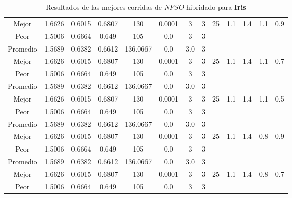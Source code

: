 \begin{table}[h!]
\begin{center}
\begin{tabular}{|c|c|c|c|c|c|c|c|c|c|c|c|c|}
            \cline{1-8}
            Mejor & 1.6626 & 0.6015  & 0.6807 & 130 & 0.0001 & 3 & 3 & 25 & 1.1 & 1.4 & 1.1 & 0.9\\
            \cline{1-8}
            Peor & 1.5006 & 0.6664  & 0.649 & 105 & 0.0 & 3 & 3 &  &  &  &  & \\
        \hline
        \hline
            Promedio  & 1.5689 & 0.6382 & 0.6612 & 136.0667 & 0.0 & 3.0 & 3 &  &  &  &  & \\
            \cline{1-8}
            Mejor & 1.6626 & 0.6015  & 0.6807 & 130 & 0.0001 & 3 & 3 & 25 & 1.1 & 1.4 & 1.1 & 0.7\\
            \cline{1-8}
            Peor & 1.5006 & 0.6664  & 0.649 & 105 & 0.0 & 3 & 3 &  &  &  &  & \\
        \hline
        \hline
            Promedio  & 1.5689 & 0.6382 & 0.6612 & 136.0667 & 0.0 & 3.0 & 3 &  &  &  &  & \\
            \cline{1-8}
            Mejor & 1.6626 & 0.6015  & 0.6807 & 130 & 0.0001 & 3 & 3 & 25 & 1.1 & 1.4 & 1.1 & 0.5\\
            \cline{1-8}
            Peor & 1.5006 & 0.6664  & 0.649 & 105 & 0.0 & 3 & 3 &  &  &  &  & \\
        \hline
        \hline
            Promedio  & 1.5689 & 0.6382 & 0.6612 & 136.0667 & 0.0 & 3.0 & 3 &  &  &  &  & \\
            \cline{1-8}
            Mejor & 1.6626 & 0.6015  & 0.6807 & 130 & 0.0001 & 3 & 3 & 25 & 1.1 & 1.4 & 0.8 & 0.9\\
            \cline{1-8}
            Peor & 1.5006 & 0.6664  & 0.649 & 105 & 0.0 & 3 & 3 &  &  &  &  & \\
        \hline
        \hline
            Promedio  & 1.5689 & 0.6382 & 0.6612 & 136.0667 & 0.0 & 3.0 & 3 &  &  &  &  & \\
            \cline{1-8}
            Mejor & 1.6626 & 0.6015  & 0.6807 & 130 & 0.0001 & 3 & 3 & 25 & 1.1 & 1.4 & 0.8 & 0.7\\
            \cline{1-8}
            Peor & 1.5006 & 0.6664  & 0.649 & 105 & 0.0 & 3 & 3 &  &  &  &  & \\
        \hline
        \end{tabular}
        \caption{Resultados de las mejores corridas de \emph{NPSO} hibridado para {\bf Iris}}
        \label{tb:tablepsohibcsv}
    \end{center}
\end{table}


